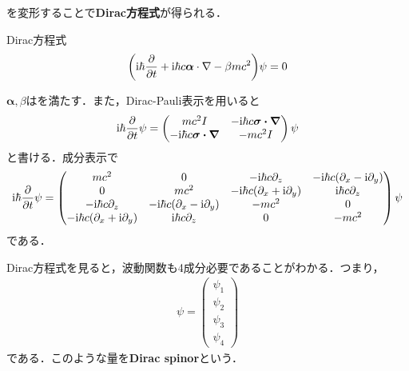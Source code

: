\documentclass{report}
\begin{document}
を変形することで\textbf{Dirac方程式}が得られる．
\begin{itembox}[l]{Dirac方程式}
\begin{align}
  \qty(\mathrm{i}\hbar \frac{\partial}{\partial t} + \mathrm{i} \hbar c \bm{\alpha}\cdot \nabla - \beta mc^2)\psi = 0
\end{align}
\end{itembox}
$\bm{\alpha},\beta$はを満たす．また，Dirac-Pauli表示を用いると
\begin{align}
  \mathrm{i}\hbar \frac{\partial}{\partial t}\psi = 
  \begin{pmatrix}
    mc^2 I & -\mathrm{i}\hbar c \bm{\sigma\cdot\nabla}\\
    -\mathrm{i}\hbar c \bm{\sigma\cdot\nabla} & -mc^2 I
  \end{pmatrix}
  \psi
\end{align}
と書ける．成分表示で
\begin{align}
  \label{dirac-eq-matrix}
  \mathrm{i}\hbar\frac{\partial}{\partial t}\psi =
  \begin{pmatrix}
    mc^2 & 0 & -\mathrm{i}\hbar c\partial_z & -\mathrm{i}\hbar c(\partial_x -\mathrm{i} \partial_y)\\
    0 & mc^2 & -\mathrm{i}\hbar c(\partial_x +\mathrm{i} \partial_y) & \mathrm{i}\hbar c\partial_z \\
    -\mathrm{i}\hbar c\partial_z & -\mathrm{i}\hbar c(\partial_x -\mathrm{i} \partial_y) & -mc^2 & 0\\
    -\mathrm{i}\hbar c(\partial_x +\mathrm{i} \partial_y) & \mathrm{i}\hbar c\partial_z & 0 & -mc^2
  \end{pmatrix}
  \psi
\end{align}
である．

Dirac方程式を見ると，波動関数も4成分必要であることがわかる．つまり，
\begin{align}
  \psi = 
  \begin{pmatrix}
    \psi_1\\\psi_2\\\psi_3\\\psi_4
  \end{pmatrix}
\end{align}
である．このような量を\textbf{Dirac spinor}という．
\end{document}
